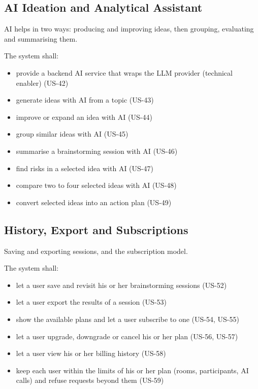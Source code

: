 \documentclass[12pt,a4paper]{report}
\begin{document}
\subsection{AI Ideation and Analytical Assistant}
\label{subsec:fr-ai}

AI helps in two ways: producing and improving ideas, then grouping, evaluating and summarising them.

\noindent The system shall:
\begin{itemize}
  \item provide a backend AI service that wraps the LLM provider (technical enabler) (US-42)
  \item generate ideas with AI from a topic (US-43)
  \item improve or expand an idea with AI (US-44)
  \item group similar ideas with AI (US-45)
  \item summarise a brainstorming session with AI (US-46)
  \item find risks in a selected idea with AI (US-47)
  \item compare two to four selected ideas with AI (US-48)
  \item convert selected ideas into an action plan (US-49)
\end{itemize}

\subsection{History, Export and Subscriptions}
\label{subsec:fr-history}

Saving and exporting sessions, and the subscription model.

\noindent The system shall:
\begin{itemize}
  \item let a user save and revisit his or her brainstorming sessions (US-52)
  \item let a user export the results of a session (US-53)
  \item show the available plans and let a user subscribe to one (US-54, US-55)
  \item let a user upgrade, downgrade or cancel his or her plan (US-56, US-57)
  \item let a user view his or her billing history (US-58)
  \item keep each user within the limits of his or her plan (rooms, participants, AI calls) and refuse requests beyond them (US-59)
\end{itemize}
\end{document}
